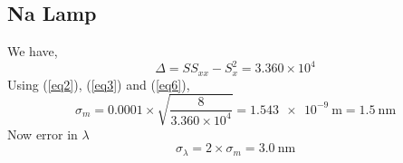 \documentclass{article}
\begin{document}
    \subsection{Na Lamp}
    We have,
    \begin{equation}
    \label{eq6}
        \Delta = S S_{xx} - S_{x}^2 = 3.360 \times 10^4
    \end{equation}
    Using (\ref{eq2}), (\ref{eq3}) and (\ref{eq6}),  
    \begin{equation}
    \label{eq7}
        \sigma_m = 0.0001 \times \sqrt{\dfrac{8}{3.360 \times 10^4}} = \SI{1.543e-9}{\metre} = \SI{1.5}{\nano \metre}
    \end{equation}
    Now error in $\lambda$
    \begin{equation}
    \label{eq9}
        \boxed{\sigma_{\lambda} = 2 \times \sigma_{m} = \SI{3.0}{\nano \metre}}
    \end{equation}
\end{document}
